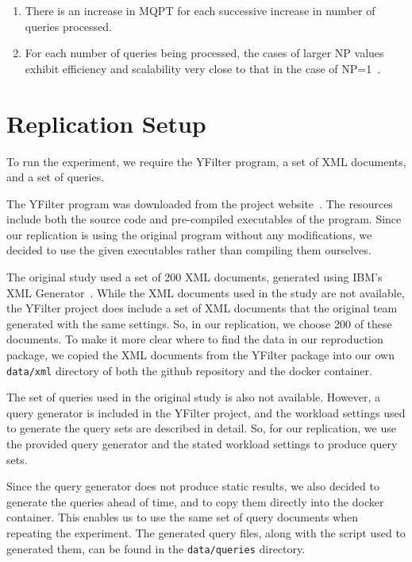 \documentclass[sigconf, nonacm]{acmart}
\begin{document}
\begin{enumerate}
    \item There is an increase in MQPT for each successive increase in number of queries processed.

    \item For each number of queries being processed, the cases of larger NP values exhibit efficiency and scalability very close to that in the case of NP=1~\cite{yfilter}.
\end{enumerate}


\section{Replication Setup}

To run the experiment, we require the YFilter program, a set of XML documents, and a set of queries. 

The YFilter program was downloaded from the project website~\cite{yfilter_source}. The resources include both the source code and pre-compiled executables of the program. Since our replication is using the original program without any modifications, we decided to use the given executables rather than compiling them ourselves. 

The original study used a set of 200 XML documents, generated using IBM's XML Generator~\cite{IBM_XML}. While the XML documents used in the study are not available, the YFilter project does include a set of XML documents that the original team generated with the same settings. So, in our replication, we choose 200 of these documents. To make it more clear where to find the data in our reproduction package, we copied the XML documents from the YFilter package into our own \texttt{data/xml} directory of both the github repository and the docker container.

The set of queries used in the original study is also not available. However, a query generator is included in the YFilter project, and the workload settings used to generate the query sets are described in detail. So, for our replication, we use the provided query generator and the stated workload settings to produce query sets.

Since the query generator does not produce static results, we also decided to generate the queries ahead of time, and to copy them directly into the docker container. This enables us to use the same set of query documents when repeating the experiment. The generated query files, along with the script used to generated them, can be found in the \texttt{data/queries} directory.
\end{document}
